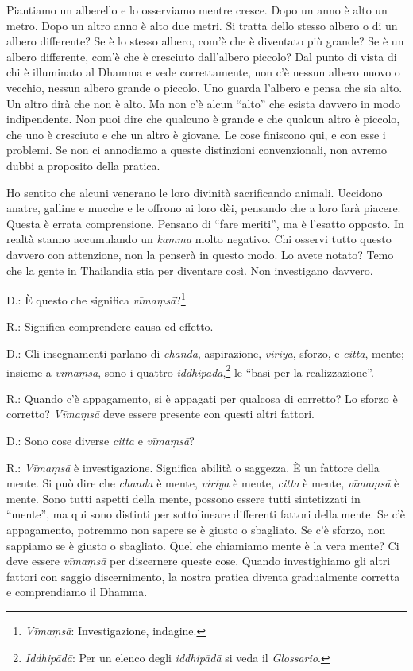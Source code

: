 Piantiamo un alberello e lo osserviamo mentre cresce. Dopo un anno è
alto un metro. Dopo un altro anno è alto due metri. Si tratta dello
stesso albero o di un albero differente? Se è lo stesso albero, com'è
che è diventato più grande? Se è un albero differente, com'è che è
cresciuto dall'albero piccolo? Dal punto di vista di chi è illuminato al
Dhamma e vede correttamente, non c'è nessun albero nuovo o vecchio,
nessun albero grande o piccolo. Uno guarda l'albero e pensa che sia
alto. Un altro dirà che non è alto. Ma non c'è alcun ``alto'' che esista
davvero in modo indipendente. Non puoi dire che qualcuno è grande e che
qualcun altro è piccolo, che uno è cresciuto e che un altro è giovane.
Le cose finiscono qui, e con esse i problemi. Se non ci annodiamo a
queste distinzioni convenzionali, non avremo dubbi a proposito della
pratica.

Ho sentito che alcuni venerano le loro divinità sacrificando animali.
Uccidono anatre, galline e mucche e le offrono ai loro dèi, pensando che
a loro farà piacere. Questa è errata comprensione. Pensano di ``fare
meriti'', ma è l'esatto opposto. In realtà stanno accumulando un
\emph{kamma} molto negativo. Chi osservi tutto questo davvero con
attenzione, non la penserà in questo modo. Lo avete notato? Temo che la
gente in Thailandia stia per diventare così. Non investigano davvero.

D.: È questo che significa \emph{vīmaṃsā}?\footnote{\emph{Vīmaṃsā}:
  Investigazione, indagine.}

R.: Significa comprendere causa ed effetto.

D.: Gli insegnamenti parlano di \emph{chanda}, aspirazione,
\emph{viriya}, sforzo, e \emph{citta}, mente; insieme a \emph{vīmaṃsā},
sono i quattro \emph{iddhipādā},\footnote{\emph{Iddhipādā}: Per un
  elenco degli \emph{iddhipādā} si veda il \emph{Glossario}.} le ``basi
per la realizzazione''.

R.: Quando c'è appagamento, si è appagati per qualcosa di corretto? Lo
sforzo è corretto? \emph{Vīmaṃsā} deve essere presente con questi altri
fattori.

D.: Sono cose diverse \emph{citta} e \emph{vīmaṃsā}?

R.: \emph{Vīmaṃsā} è investigazione. Significa abilità o saggezza. È un
fattore della mente. Si può dire che \emph{chanda} è mente,
\emph{viriya} è mente, \emph{citta} è mente, \emph{vīmaṃsā} è mente.
Sono tutti aspetti della mente, possono essere tutti sintetizzati in
``mente'', ma qui sono distinti per sottolineare differenti fattori
della mente. Se c'è appagamento, potremmo non sapere se è giusto o
sbagliato. Se c'è sforzo, non sappiamo se è giusto o sbagliato. Quel che
chiamiamo mente è la vera mente? Ci deve essere \emph{vīmaṃsā} per
discernere queste cose. Quando investighiamo gli altri fattori con
saggio discernimento, la nostra pratica diventa gradualmente corretta e
comprendiamo il Dhamma.

